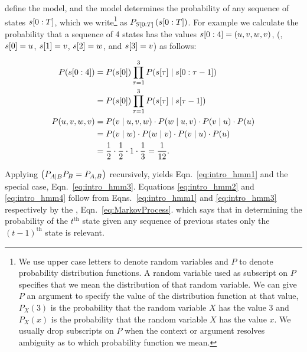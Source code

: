 define the model, and the model determines the probability of any
sequence of states $s[0:T]$, which we write\footnote{We use
  upper case letters to denote random variables and $P$ to denote
  probability distribution functions.  A random variable used as
  subscript on $P$ specifies that we mean the distribution of that
  random variable.  We can give $P$ an argument to specify the value
  of the distribution function at that value, \eg $P_X(3)$ is the
  probability that the random variable $X$ has the value 3 and
  $P_X(x)$ is the probability that the random variable $X$ has the
  value $x$.  We usually drop subscripts on $P$ when the context or
  argument resolves ambiguity as to which probability function we
  mean.} as $P_{S[0:T]}\left( s[0:T] \right)$.  For
example we calculate the probability that a sequence of 4 states has
the values $s[0:4] = (u,v,w,v)$, (\ie, ${s}{[0]} = u$,
${s}{[1]} = v$, ${s}{[2]} = w$, and ${s}{[3]} = v$) as follows:

\begin{align}
  \label{eq:intro_hmm1}
  P(\ts{s}{0}{4}) &= P(\ti{s}{0}) \prod_{\tau=1}^3 %
                     P(\ti{s}{\tau}\given \ts{s}{0}{\tau-1})\\
  \label{eq:intro_hmm2}
                  &= P(\ti{s}{0}) \prod_{\tau=1}^3 %
                     P(\ti{s}{\tau}\given \ti{s}{\tau-1}) \\
  \label{eq:intro_hmm3}
  P(u,v,w,v)      &= P(v\given u,v,w) \cdot P(w\given u,v) \cdot  P(v\given u) \cdot P(u)\\
  \label{eq:intro_hmm4}
        &= P(v\given w) \cdot P(w\given v) \cdot  P(v\given u) \cdot P(u)\\
  \label{eq:intro_hmm5}
        &= \frac{1}{2} \cdot \frac{1}{2} \cdot 1 %
                     \cdot \frac{1}{3} = \frac{1}{12}.
\end{align}

Applying  $\left( P_{A\mid B} P_B = P_{A,B} \right)$
recursively, yields Eqn.~\eqref{eq:intro_hmm1} and the special case,
Eqn.~\eqref{eq:intro_hmm3}.  Equations \eqref{eq:intro_hmm2} and
\eqref{eq:intro_hmm4} follow from Eqns.~\eqref{eq:intro_hmm1} and
\eqref{eq:intro_hmm3} respectively by the %
\emph{}, Eqn.~\eqref{eq:MarkovProcess}.
which says that in determining the probability of the $t^\text{th}$
state given any sequence of previous states only the $(t-1)^\text{th}$
state is relevant. %


